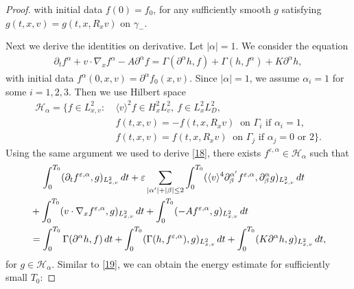 \documentclass[reqno,a4paper]{amsart}
\numberwithin{equation}{section}
\newcommand{\1}{\mathbf{1}}
\newcommand{\ve}{\varepsilon}
\newcommand{\<}{\langle}
\renewcommand{\>}{\rangle}
\begin{document}
\begin{proof}
with initial data $f(0)=f_0$, for any sufficiently smooth $g$ satisfying ${g}(t,x,v) = {g}(t,x,R_xv)$ on $\gamma_-$.
	
	Next we derive the identities on derivative. Let $|\alpha|=1$. We consider the equation 
	\begin{align*}
		\partial_tf^{\alpha} + v\cdot \nabla_xf^{\alpha}  - A \partial^{\alpha} f = \Gamma(\partial^{\alpha} h,f)+\Gamma(h,f^{\alpha} )+ K\partial^{\alpha} h,
	\end{align*}
	with initial data $f^{\alpha}(0,x,v)=\partial^{\alpha} f_0(x,v)$.
	Since $|\alpha|=1$, we assume $\alpha_i=1$ for some $i=1,2,3$. 
	Then we use Hilbert space 
	\begin{align*}
		\mathcal{H}_{\alpha} = \big\{f\in L^2_{x,v}:\ &\<v\>^{2} f\in H^2_xL^2_v,\ f\in L^2_xL^2_D, \\ &{f}(t,x,v) = -{f}(t,x,R_xv)\ \text{ on $\Gamma_i$ if $\alpha_i=1$},\\
		&{f}(t,x,v) = {f}(t,x,R_xv)\ \text{ on $\Gamma_j$ if $\alpha_j=0$ or $2$}
\big\}.
	\end{align*} Using the same argument we used to derive \eqref{18}, there exists $f^{\ve,\alpha}\in\mathcal{H}_{\alpha}$ such that 
\begin{align*}\notag
	&\quad\,\int^{T_0}_0(\partial_tf^{\ve,\alpha},g)_{L^2_{x,v}}\,dt+ \ve\sum_{|\alpha'|+|\beta|\le 2}\int^{T_0}_0(\<v\>^{4}\partial^{\alpha'}_\beta  f^{\ve,\alpha},\partial^\alpha_\beta  g)_{L^2_{x,v}}\,dt\\
	\notag&+\int^{T_0}_0(v\cdot \nabla_xf^{\ve,\alpha},g)_{L^2_{x,v}}\,dt 
	+\int^{T_0}_0(- A f^{\ve,\alpha},g)_{L^2_{x,v}}\,dt\\ &=\int^{T_0}_0\Gamma(\partial^{\alpha} h,f)\,dt+ \int^{T_0}_0(\Gamma(h,f^{\ve,\alpha}),g)_{L^2_{x,v}}\,dt+\int^{T_0}_0(K\partial^{\alpha}h,g)_{L^2_{x,v}}\,dt,
\end{align*}for $g\in\mathcal{H}_{\alpha}$.
Similar to \eqref{19}, we can obtain the energy estimate for sufficiently small $T_0$:

\end{proof}
\end{document}
